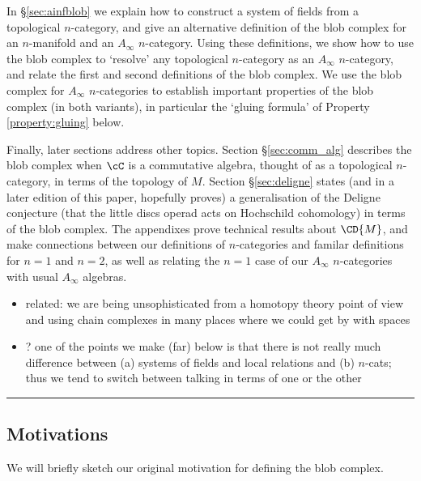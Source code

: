 In  \S \ref{sec:ainfblob} we explain how to construct a system of fields from a topological $n$-category, and give an alternative definition of the blob complex for an $n$-manifold and an $A_\infty$ $n$-category. Using these definitions, we show how to use the blob complex to `resolve' any topological $n$-category as an $A_\infty$ $n$-category, and relate the first and second definitions of the blob complex. We use the blob complex for $A_\infty$ $n$-categories to establish important properties of the blob complex (in both variants), in particular the `gluing formula' of Property \ref{property:gluing} below.


Finally, later sections address other topics. Section \S \ref{sec:comm_alg} describes the blob complex when $\cC$ is a commutative algebra, thought of as a topological $n$-category, in terms of the topology of $M$. Section \S \ref{sec:deligne} states (and in a later edition of this paper, hopefully proves) a generalisation of the Deligne conjecture (that the little discs operad acts on Hochschild cohomology) in terms of the blob complex. The appendixes prove technical results about $\CD{M}$, and make connections between our definitions of $n$-categories and familar definitions for $n=1$ and $n=2$, as well as relating the $n=1$ case of our $A_\infty$ $n$-categories with usual $A_\infty$ algebras.


\begin{itemize}
\item related: we are being unsophisticated from a homotopy theory point of
view and using chain complexes in many places where we could get by with spaces
\item ? one of the points we make (far) below is that there is not really much
difference between (a) systems of fields and local relations and (b) $n$-cats;
thus we tend to switch between talking in terms of one or the other
\end{itemize}

\medskip\hrule\medskip

\subsection{Motivations}
\label{sec:motivations}

We will briefly sketch our original motivation for defining the blob complex.

